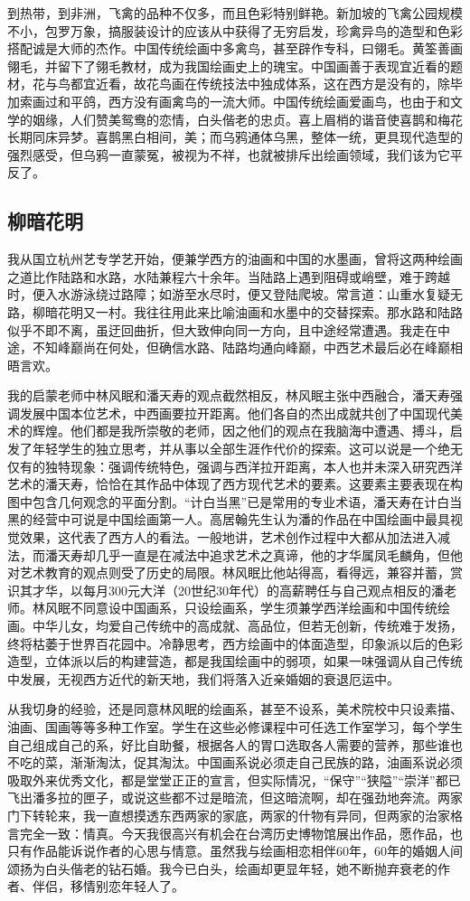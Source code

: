 \documentclass{article}
\begin{document}
到热带，到非洲，飞禽的品种不仅多，而且色彩特别鲜艳。新加坡的飞禽公园规模不小，包罗万象，搞服装设计的应该从中获得了无穷启发，珍禽异鸟的造型和色彩搭配诚是大师的杰作。中国传统绘画中多禽鸟，甚至辟作专科，曰翎毛。黄筌善画翎毛，并留下了翎毛教材，成为我国绘画史上的瑰宝。中国画善于表现宜近看的题材，花与鸟都宜近看，故花鸟画在传统技法中独成体系，这在西方是没有的，除毕加索画过和平鸽，西方没有画禽鸟的一流大师。中国传统绘画爱画鸟，也由于和文学的姻缘，人们赞美鸳鸯的恋情，白头偕老的忠贞。喜上眉梢的谐音使喜鹊和梅花长期同床异梦。喜鹊黑白相间，美；而乌鸦通体乌黑，整体一统，更具现代造型的强烈感受，但乌鸦一直蒙冤，被视为不祥，也就被排斥出绘画领域，我们该为它平反了。
\subsection{柳暗花明}
我从国立杭州艺专学艺开始，便兼学西方的油画和中国的水墨画，曾将这两种绘画之道比作陆路和水路，水陆兼程六十余年。当陆路上遇到阻碍或峭壁，难于跨越时，便入水游泳绕过路障；如游至水尽时，便又登陆爬坡。常言道：山重水复疑无路，柳暗花明又一村。我往往用此来比喻油画和水墨中的交替探索。那水路和陆路似乎不即不离，虽迂回曲折，但大致伸向同一方向，且中途经常遭遇。我走在中途，不知峰巅尚在何处，但确信水路、陆路均通向峰巅，中西艺术最后必在峰巅相晤言欢。

我的启蒙老师中林风眠和潘天寿的观点截然相反，林风眠主张中西融合，潘天寿强调发展中国本位艺术，中西画要拉开距离。他们各自的杰出成就共创了中国现代美术的辉煌。他们都是我所崇敬的老师，因之他们的观点在我脑海中遭遇、搏斗，启发了年轻学生的独立思考，并从事以全部生涯作代价的探索。这可以说是一个绝无仅有的独特现象：强调传统特色，强调与西洋拉开距离，本人也并未深入研究西洋艺术的潘天寿，恰恰在其作品中体现了西方现代艺术的要素。这要素主要表现在构图中包含几何观念的平面分割。“计白当黑”已是常用的专业术语，潘天寿在计白当黑的经营中可说是中国绘画第一人。高居翰先生认为潘的作品在中国绘画中最具视觉效果，这代表了西方人的看法。一般地讲，艺术创作过程中大都从加法进入减法，而潘天寿却几乎一直是在减法中追求艺术之真谛，他的才华属凤毛麟角，但他对艺术教育的观点则受了历史的局限。林风眠比他站得高，看得远，兼容并蓄，赏识其才华，以每月300元大洋（20世纪30年代）的高薪聘任与自己观点相反的潘老师。林风眠不同意设中国画系，只设绘画系，学生须兼学西洋绘画和中国传统绘画。中华儿女，均爱自己传统中的高成就、高品位，但若无创新，传统难于发扬，终将枯萎于世界百花园中。冷静思考，西方绘画中的体面造型，印象派以后的色彩造型，立体派以后的构建营造，都是我国绘画中的弱项，如果一味强调从自己传统中发展，无视西方近代的新天地，我们将落入近亲婚姻的衰退厄运中。

从我切身的经验，还是同意林风眠的绘画系，甚至不设系，美术院校中只设素描、油画、国画等等多种工作室。学生在这些必修课程中可任选工作室学习，每个学生自己组成自己的系，好比自助餐，根据各人的胃口选取各人需要的营养，那些谁也不吃的菜，渐渐淘汰，促其淘汰。中国画系说必须走自己民族的路，油画系说必须吸取外来优秀文化，都是堂堂正正的宣言，但实际情况，“保守”“狭隘”“崇洋”都已飞出潘多拉的匣子，或说这些都不过是暗流，但这暗流啊，却在强劲地奔流。两家门下转轮来，我一直想摸透东西两家的家底，两家的什物有异同，但两家的治家格言完全一致：情真。今天我很高兴有机会在台湾历史博物馆展出作品，愿作品，也只有作品能诉说作者的心思与情意。虽然我与绘画相恋相伴60年，60年的婚姻人间颂扬为白头偕老的钻石婚。我今已白头，绘画却更显年轻，她不断抛弃衰老的作者、伴侣，移情别恋年轻人了。
\end{document}
